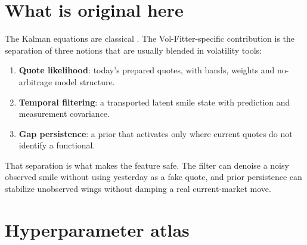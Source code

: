 \documentclass[11pt]{article}
\begin{document}
\section{What is original here}
\label{sec:original}

The Kalman equations are classical \cite{Kalman1960,AndersonMoore1979}. The
Vol-Fitter-specific contribution is the separation of three notions that are
usually blended in volatility tools:
\begin{enumerate}[leftmargin=1.6em]
\item \textbf{Quote likelihood}: today's prepared quotes, with bands, weights
and no-arbitrage model structure.
\item \textbf{Temporal filtering}: a transported latent smile state with
prediction and measurement covariance.
\item \textbf{Gap persistence}: a prior that activates only where current quotes
do not identify a functional.
\end{enumerate}
That separation is what makes the feature safe. The filter can denoise a noisy
observed smile without using yesterday as a fake quote, and prior persistence can
stabilize unobserved wings without damping a real current-market move.

\appendix
\section{Hyperparameter atlas}
\label{app:atlas}
\end{document}
